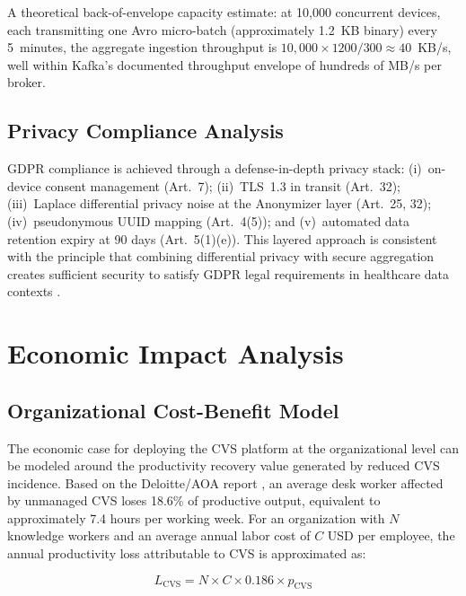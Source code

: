 \documentclass[conference]{IEEEtran}
\begin{document}
A theoretical back-of-envelope capacity estimate: at 10,000 concurrent devices, each
transmitting one Avro micro-batch (approximately 1.2~KB binary) every 5~minutes,
the aggregate ingestion throughput is $10{,}000 \times 1200 / 300 \approx 40$~KB/s,
well within Kafka's documented throughput envelope of hundreds of MB/s per broker.

\subsection{Privacy Compliance Analysis}

GDPR compliance is achieved through a defense-in-depth privacy stack:
(i)~on-device consent management (Art.~7); (ii)~TLS~1.3 in transit (Art.~32);
(iii)~Laplace differential privacy noise at the Anonymizer layer (Art.~25, 32);
(iv)~pseudonymous UUID mapping (Art.~4(5)); and (v)~automated data retention expiry
at 90 days (Art.~5(1)(e)). This layered approach is consistent with the principle
that combining differential privacy with secure aggregation creates sufficient security
to satisfy GDPR legal requirements in healthcare data contexts \cite{b11,b13,b23}.

\section{Economic Impact Analysis}

\subsection{Organizational Cost-Benefit Model}

The economic case for deploying the CVS platform at the organizational level can be
modeled around the productivity recovery value generated by reduced CVS incidence.
Based on the Deloitte/AOA report \cite{b16}, an average desk worker affected by
unmanaged CVS loses 18.6\% of productive output, equivalent to approximately 7.4
hours per working week. For an organization with $N$ knowledge workers and an average
annual labor cost of $C$ USD per employee, the annual productivity loss attributable
to CVS is approximated as:

\begin{equation}
  L_{\text{CVS}} = N \times C \times 0.186 \times p_{\text{CVS}}
  \label{eq:loss}
\end{equation}
\end{document}

